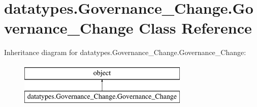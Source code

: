\hypertarget{classdatatypes_1_1Governance__Change_1_1Governance__Change}{}\section{datatypes.\+Governance\+\_\+\+Change.\+Governance\+\_\+\+Change Class Reference}
\label{classdatatypes_1_1Governance__Change_1_1Governance__Change}
Inheritance diagram for datatypes.\+Governance\+\_\+\+Change.\+Governance\+\_\+\+Change\+:\begin{figure}[H]
\begin{center}
\leavevmode
\includegraphics[height=2.000000cm]{classdatatypes_1_1Governance__Change_1_1Governance__Change}
\end{center}
\end{figure}
